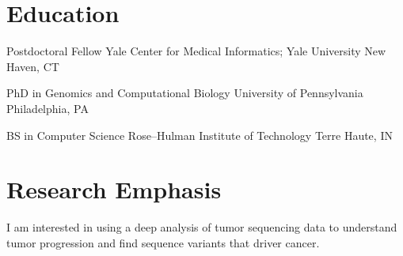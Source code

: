 \documentclass [10pt, letterpaper]{moderncv}
\begin{document}
\maketitle


\section {Education}

         {Postdoctoral Fellow}
         {Yale Center for Medical Informatics; Yale University}
         {New Haven, CT}
         {}
         {}

         {PhD in Genomics and Computational Biology}
         {University of Pennsylvania}
         {Philadelphia, PA}
         {}
         {}

         {BS in Computer Science}
         {Rose--Hulman Institute of Technology}
         {Terre Haute, IN}
         {}
         {}

\section {Research Emphasis}
\cvline {} {I am interested in using a deep analysis of tumor
  sequencing data to understand tumor progression and find sequence
  variants that driver cancer.}






\end{document}

